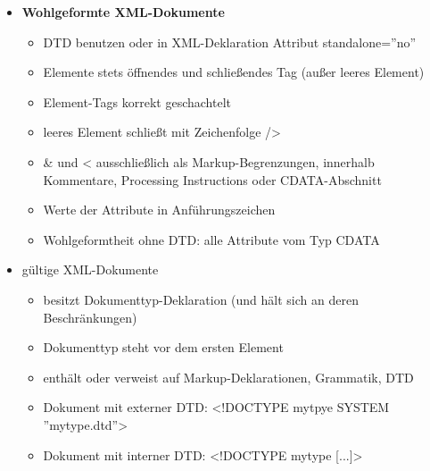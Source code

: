 \begin{itemize}
	\item \textbf{Wohlgeformte XML-Dokumente}
	\begin{itemize}
		\item DTD benutzen oder in XML-Deklaration Attribut standalone=''no''
		\item Elemente stets öffnendes und schließendes Tag (außer leeres Element)
		\item Element-Tags korrekt geschachtelt
		\item leeres Element schließt mit Zeichenfolge />
		\item \& und < ausschließlich als Markup-Begrenzungen, innerhalb Kommentare, Processing Instructions oder CDATA-Abschnitt
		\item Werte der Attribute in Anführungszeichen
		\item Wohlgeformtheit ohne DTD: alle Attribute vom Typ CDATA
	\end{itemize}
	
	\item gültige XML-Dokumente
	\begin{itemize}
		\item besitzt Dokumenttyp-Deklaration (und hält sich an deren Beschränkungen)
		\item Dokumenttyp steht vor dem ersten Element
		\item enthält oder verweist auf Markup-Deklarationen, Grammatik, DTD
		\item Dokument mit externer DTD: <!DOCTYPE mytpye SYSTEM ''mytype.dtd''>
		\item Dokument mit interner DTD: <!DOCTYPE mytype [...]>
	\end{itemize}
\end{itemize}

